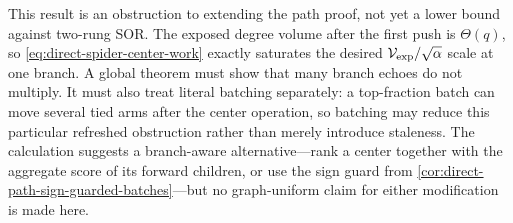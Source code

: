 This result is an obstruction to extending the path proof, not yet a lower
bound against two-rung SOR. The exposed degree volume after the first push is
$\Theta(q)$, so \cref{eq:direct-spider-center-work} exactly saturates the
desired $\mathcal V_{\rm exp}/\sqrt\alpha$ scale at one branch. A global
theorem must show that many branch echoes do not multiply. It must also treat
literal batching separately: a top-fraction batch can move several tied arms
after the center operation, so batching may reduce this particular refreshed
obstruction rather than merely introduce staleness. The calculation suggests
a branch-aware alternative---rank a center together with the aggregate score
of its forward children, or use the sign guard from
\cref{cor:direct-path-sign-guarded-batches}---but no graph-uniform claim for
either modification is made here.
